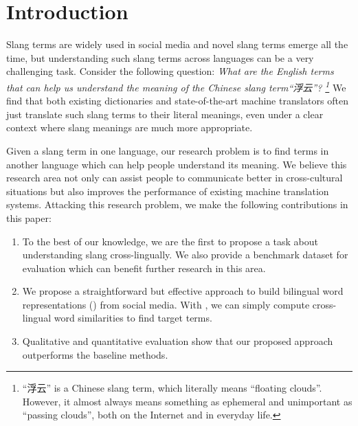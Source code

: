 \section{Introduction}
\label{sec:intro}
Slang terms are widely used in social media and novel slang terms emerge all the time, but understanding such slang terms across languages can be a very challenging task.
Consider the following question:
 {\em What are the English terms that can help us understand the meaning of the Chinese slang term``浮云''? \footnote{{\scriptsize ``浮云'' is a Chinese slang term, which literally means ``floating clouds''. However,  it almost always means something as ephemeral and unimportant as ``passing clouds'', both on the Internet and in everyday life.}}} 
We find that both existing dictionaries and state-of-the-art machine translators often just translate such slang terms to their literal meanings, 
even under a clear context where slang meanings are much more appropriate.  

Given a slang term in one language, our research problem is to find terms in another language which can help people understand its meaning.
We believe this research area not only can assist people to communicate better in cross-cultural situations but also improves the performance of existing machine translation systems.  
Attacking this research problem, we make the following contributions in this paper:
\begin{enumerate}
	\itemsep0em 
	\item To the best of our knowledge, we are the first to propose a task about understanding slang cross-lingually. 
	We also provide a benchmark dataset for evaluation which can benefit  further research in this area. 
	
	\item We propose a straightforward but effective approach to build bilingual word representations (\textit{\socvec}) from social media. 
	With \textit{\socvec}, we can simply compute cross-lingual word similarities to find target terms. 
	\item Qualitative and quantitative evaluation  show that our proposed approach outperforms the baseline methods.
\end{enumerate}

